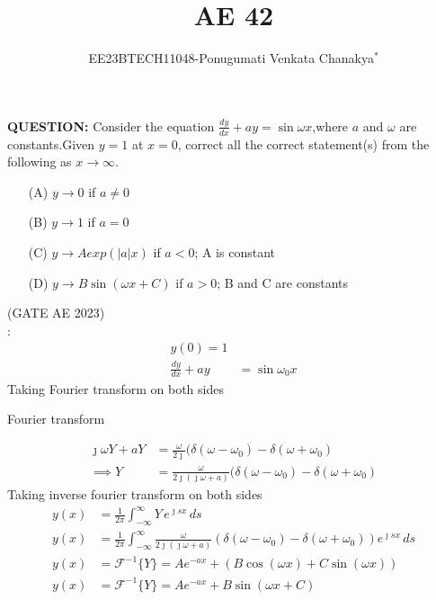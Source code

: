 \documentclass[journal,12pt,twocolumn]{IEEEtran}
\theoremstyle{remark}
\begin{document}
 
 \vspace{3cm}
 \title{\textbf{AE 42}}
 \author{EE23BTECH11048-Ponugumati Venkata Chanakya$^{*}$%
 }
 \maketitle
 \newpage
 \bigskip
 \renewcommand{\thefigure}{\theenumi}
 \renewcommand{\thetable}{\theenumi}
 \textbf{QUESTION:}
Consider the equation $\frac{dy}{dx}+ay=\sin{\omega x}$,where $a$ and $\omega$ are constants.Given $y=1$ at $x=0$, correct all the correct statement(s) from the following as $x\to \infty$.
\begin{enumerate}

  \item[(A)]  $y \to 0$ if $a \neq 0$ \\ 
  \item[(B)]  $y \to 1$ if $a = 0$\\
  \item[(C)]  $y \to Aexp(|a|x)$ if $a < 0$; A is constant\\
  \item[(D)]  $y \to B \sin(\omega x+C)$ if $a>0$; B and C are constants\\
\end{enumerate}
\hfill(GATE AE 2023)\\
\solution: \\
\begin{align}
  y(0)=1\\
 \frac{dy}{dx}+ay &= \sin{\omega_0 x}
\end{align}
 Taking Fourier transform on both sides 
  \begin{table}[!ht]
    \centering
        
    \caption{Fourier transform}
    \label{tab:Gate AE 42 }
\end{table}
\begin{align}
   \jmath \omega Y+aY &= \frac{\omega}{2\jmath}(\delta(\omega-\omega_0)-\delta(\omega+\omega_0)\\
    \implies Y&=\frac{\omega}{2\jmath(\jmath\omega+a)}(\delta(\omega-\omega_0)-\delta(\omega+\omega_0)
 \end{align}
 Taking inverse fourier transform on both sides 
 \begin{align}
  y(x) &= \frac{1}{2\pi} \int_{-\infty}^{\infty} Y \, e^{\jmath sx} \, ds\\
   y(x) &= \frac{1}{2\pi} \int_{-\infty}^{\infty} \frac{\omega}{2\jmath(\jmath \omega + a)} \left( \delta(\omega - \omega_0) - \delta(\omega + \omega_0) \right) e^{\jmath sx} \, ds \\
      y(x) &= \mathcal{F}^{-1}\{Y\} = A e^{-ax} + (B\cos(\omega x) + C\sin(\omega x))\\
       y(x) &= \mathcal{F}^{-1}\{Y\} = A e^{-ax} + B\sin(\omega x+C)
 \end{align}
\end{document}

